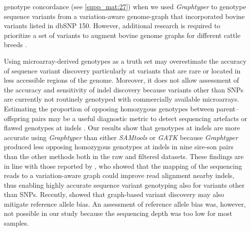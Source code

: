\documentclass[../main.tex]{subfiles}
\begin{document}
genotype concordance (see \ref{supp_mat:27}) when we used \emph{Graphtyper} to genotype sequence variants from a variation-aware genome-graph that incorporated bovine variants listed in dbSNP 150. However, additional research is required to prioritize a set of variants to augment bovine genome graphs for different cattle breeds \citep{pritt2018forge}.

Using microarray-derived genotypes as a truth set may overestimate the accuracy of sequence variant discovery particularly at variants that are rare or located in less accessible regions of the genome. Moreover, it does not allow assessment of the accuracy and sensitivity of indel discovery because variants other than SNPs are currently not routinely genotyped with commercially available microarrays. Estimating the proportion of opposing homozygous genotypes between parent–offspring pairs may be a useful diagnostic metric to detect sequencing artefacts or flawed genotypes at indels \citep{patel2014struggle}. Our results show that genotypes at indels are more accurate using \emph{Graphtyper} than either \emph{SAMtools} or \emph{GATK} because \emph{Graphtyper} produced less opposing homozygous genotypes at indels in nine sire-son pairs than the other methods both in the raw and filtered datasets. These findings are in line with those reported by \citet{eggertsson2017graphtyper}, who showed that the mapping of the sequencing reads to a variation-aware graph could improve read alignment nearby indels, thus enabling highly accurate sequence variant genotyping also for variants other than SNPs. Recently, \citet{garrison2018variation} showed that graph-based variant discovery may also mitigate reference allele bias. An assessment of reference allele bias was, however, not possible in our study because the sequencing depth was too low for most samples.
\end{document}
